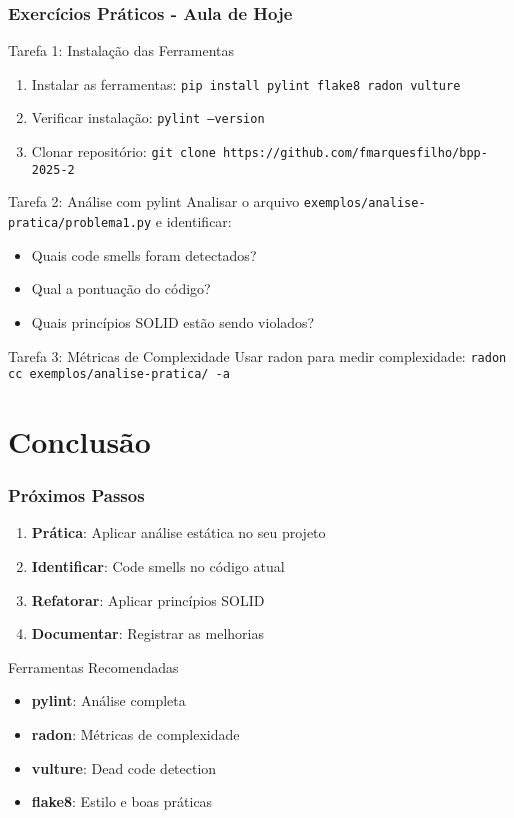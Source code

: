 \documentclass[aspectratio=169]{beamer}
\begin{document}
\begin{frame}
\frametitle{Exercícios Práticos - Aula de Hoje}
\begin{block}{Tarefa 1: Instalação das Ferramentas}
\footnotesize
\begin{enumerate}
    \item Instalar as ferramentas: \texttt{pip install pylint flake8 radon vulture}
    \item Verificar instalação: \texttt{pylint --version}
    \item Clonar repositório: \texttt{git clone https://github.com/fmarquesfilho/bpp-2025-2}
\end{enumerate}
\end{block}

\begin{block}{Tarefa 2: Análise com pylint}
\footnotesize
Analisar o arquivo \texttt{exemplos/analise-pratica/problema1.py} e identificar:
\begin{itemize}
    \item Quais code smells foram detectados?
    \item Qual a pontuação do código?
    \item Quais princípios SOLID estão sendo violados?
\end{itemize}
\end{block}

\begin{block}{Tarefa 3: Métricas de Complexidade}
\footnotesize
Usar radon para medir complexidade: \texttt{radon cc exemplos/analise-pratica/ -a}
\end{block}
\end{frame}

\section{Conclusão}

\begin{frame}
\frametitle{Próximos Passos}
\begin{enumerate}
    \item \textbf{Prática}: Aplicar análise estática no seu projeto
    \item \textbf{Identificar}: Code smells no código atual
    \item \textbf{Refatorar}: Aplicar princípios SOLID
    \item \textbf{Documentar}: Registrar as melhorias
\end{enumerate}

\vspace{0.5cm}
\begin{block}{Ferramentas Recomendadas}
\footnotesize
\begin{itemize}
    \item \textbf{pylint}: Análise completa
    \item \textbf{radon}: Métricas de complexidade
    \item \textbf{vulture}: Dead code detection
    \item \textbf{flake8}: Estilo e boas práticas
\end{itemize}
\end{block}
\end{frame}
\end{document}
